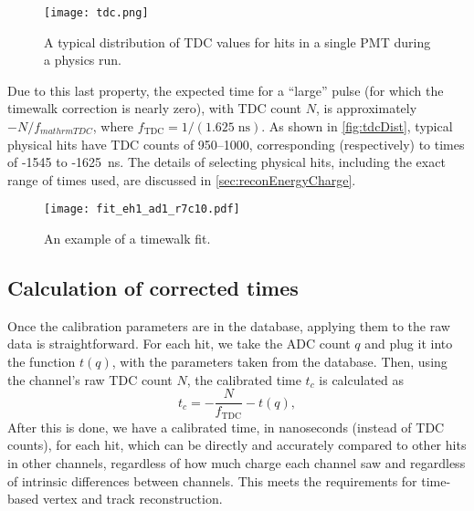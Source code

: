 \documentclass[../thesis.tex]{subfiles}
\begin{document}
\begin{figure}[ht]
  \texttt{[image: tdc.png]}
  \caption{A typical distribution of TDC values for hits in a single PMT during
    a physics run.}
  \label{fig:tdcDist}
\end{figure}

Due to this last property, the expected time for a ``large'' pulse (for which
the timewalk correction is nearly zero), with TDC count $N$, is approximately
$-N/f_{mathrm{TDC}}$, where $f_{\mathrm{TDC}} = 1/(1.625\;\text{ns})$. As shown
in \autoref{fig:tdcDist}, typical physical hits have TDC counts of 950--1000,
corresponding (respectively) to times of -1545 to -1625~ns. The details of
selecting physical hits, including the exact range of times used, are discussed
in \autoref{sec:reconEnergyCharge}.


\begin{figure}
  \texttt{[image: fit\_eh1\_ad1\_r7c10.pdf]}
  \caption{An example of a timewalk fit.}
  \label{fig:timewalk}
\end{figure}

\begin{comment}
  Show the tof-corrected times; comment on TDC discretization.
\end{comment}

\subsection{Calculation of corrected times}

Once the calibration parameters are in the database, applying them to the raw
data is straightforward. For each hit, we take the ADC count $q$ and plug it
into the function $t(q)$, with the parameters taken from the database. Then,
using the channel's raw TDC count $N$, the calibrated time $t_c$ is calculated
as
\begin{equation}
  \label{eq:corrTime}
  t_c = -\frac{N}{f_\mathrm{TDC}} - t(q),
\end{equation}
After this is done, we have a calibrated time, in nanoseconds (instead of TDC
counts), for each hit, which can be directly and accurately compared to other
hits in other channels, regardless of how much charge each channel saw and
regardless of intrinsic differences between channels. This meets the
requirements for time-based vertex and track reconstruction.
\end{document}
